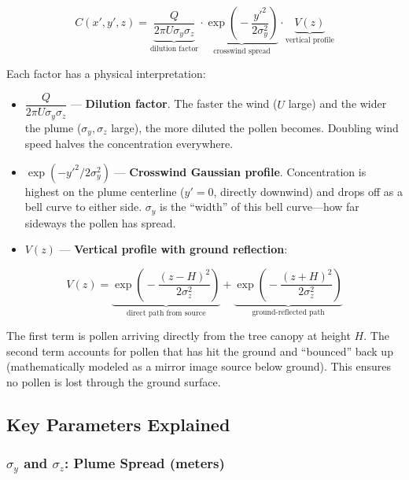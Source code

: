 \documentclass[11pt]{article}
\begin{document}
\begin{equation}
C(x',y',z) = \underbrace{\frac{Q}{2\pi U \sigma_y \sigma_z}}_{\text{dilution factor}} \cdot \underbrace{\exp\!\left(\!-\frac{y'^2}{2\sigma_y^2}\right)}_{\text{crosswind spread}} \cdot \underbrace{V(z)}_{\text{vertical profile}}
\label{eq:plume}
\end{equation}

Each factor has a physical interpretation:

\begin{itemize}
    \item $\dfrac{Q}{2\pi U \sigma_y \sigma_z}$ --- \textbf{Dilution factor}. The faster the wind ($U$ large) and the wider the plume ($\sigma_y, \sigma_z$ large), the more diluted the pollen becomes. Doubling wind speed halves the concentration everywhere.
    
    \item $\exp(-y'^2 / 2\sigma_y^2)$ --- \textbf{Crosswind Gaussian profile}. Concentration is highest on the plume centerline ($y' = 0$, directly downwind) and drops off as a bell curve to either side. $\sigma_y$ is the ``width'' of this bell curve---how far sideways the pollen has spread.
    
    \item $V(z)$ --- \textbf{Vertical profile with ground reflection}:
\end{itemize}
\begin{equation}
V(z) = \underbrace{\exp\!\left(\!-\frac{(z-H)^2}{2\sigma_z^2}\right)}_{\text{direct path from source}} + \underbrace{\exp\!\left(\!-\frac{(z+H)^2}{2\sigma_z^2}\right)}_{\text{ground-reflected path}}
\end{equation}

The first term is pollen arriving directly from the tree canopy at height $H$. The second term accounts for pollen that has hit the ground and ``bounced'' back up (mathematically modeled as a mirror image source below ground). This ensures no pollen is lost through the ground surface.

\subsection{Key Parameters Explained}

\subsubsection{$\sigma_y$ and $\sigma_z$: Plume Spread (meters)}
\end{document}
